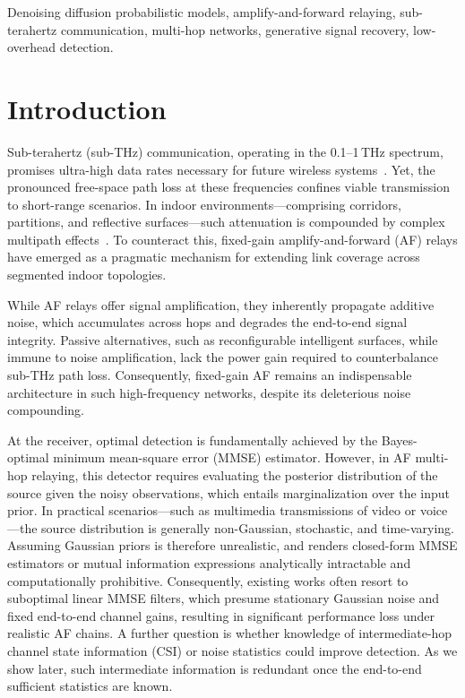 \documentclass[journal]{IEEEtran}
\begin{document}
\begin{IEEEkeywords}
Denoising diffusion probabilistic models, amplify-and-forward relaying, sub-terahertz communication, multi-hop networks, generative signal recovery, low-overhead detection.
\end{IEEEkeywords}



\section{Introduction}
Sub-terahertz (sub-THz) communication, operating in the 0.1--1\,THz spectrum, promises ultra-high data rates necessary for future wireless systems~\cite{rappaport2019wireless,koenig2013wireless}. Yet, the pronounced free-space path loss at these frequencies confines viable transmission to short-range scenarios. In indoor environments—comprising corridors, partitions, and reflective surfaces—such attenuation is compounded by complex multipath effects~\cite{goldsmith2005wireless}. To counteract this, fixed-gain amplify-and-forward (AF) relays have emerged as a pragmatic mechanism for extending link coverage across segmented indoor topologies.

While AF relays offer signal amplification, they inherently propagate additive noise, which accumulates across hops and degrades the end-to-end signal integrity. Passive alternatives, such as reconfigurable intelligent surfaces, while immune to noise amplification, lack the power gain required to counterbalance sub-THz path loss. Consequently, fixed-gain AF remains an indispensable architecture in such high-frequency networks, despite its deleterious noise compounding.

At the receiver, optimal detection is fundamentally achieved by the Bayes-optimal minimum mean-square error (MMSE) estimator. However, in AF multi-hop relaying, this detector requires evaluating the posterior distribution of the source given the noisy observations, which entails marginalization over the input prior. In practical scenarios—such as multimedia transmissions of video or voice—the source distribution is generally non-Gaussian, stochastic, and time-varying. Assuming Gaussian priors is therefore unrealistic, and renders closed-form MMSE estimators or mutual information expressions analytically intractable and computationally prohibitive. Consequently, existing works often resort to suboptimal linear MMSE filters, which presume stationary Gaussian noise and fixed end-to-end channel gains, resulting in significant performance loss under realistic AF chains. A further question is whether knowledge of intermediate-hop channel state information (CSI) or noise statistics could improve detection. As we show later, such intermediate information is redundant once the end-to-end sufficient statistics are known.
\end{document}
